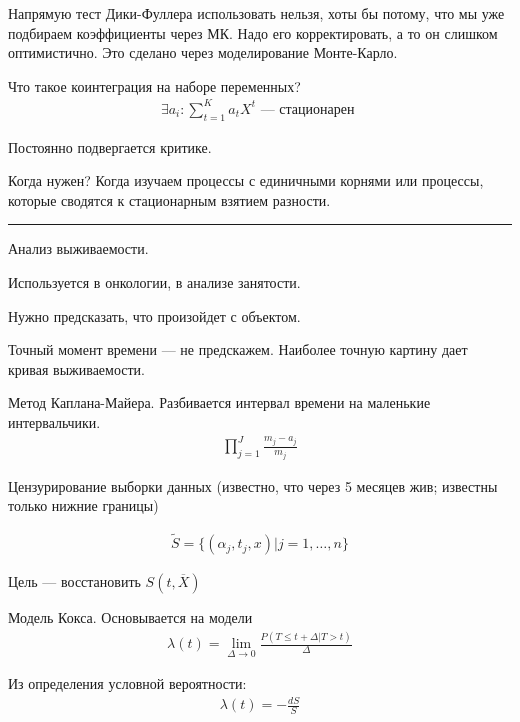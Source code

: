 \documentclass{book}
\begin{document}
Напрямую тест Дики-Фуллера использовать нельзя, хоты бы потому, что мы уже подбираем коэффициенты через МК. Надо его корректировать, а то он слишком оптимистично. Это сделано через моделирование Монте-Карло.

Что такое коинтеграция на наборе переменных?
\begin{gather*}
  \exists a_i: \sum_{t=1}^{K} {a_tX^t} \textrm{ --- стационарен }
\end{gather*}

Постоянно подвергается критике.

Когда нужен? Когда изучаем процессы с единичными корнями или процессы, которые сводятся к стационарным взятием разности.
\hrule

Анализ выживаемости.

Используется в онкологии, в анализе занятости.

Нужно предсказать, что произойдет с объектом.

Точный момент времени --- не предскажем. Наиболее точную картину дает кривая выживаемости.


Метод Каплана-Майера. Разбивается интервал времени на маленькие интервальчики.
\begin{gather*}
  \prod_{j=1}^{J} {\frac{m_j-a_j}{m_j}}
\end{gather*}

Цензурирование выборки данных (известно, что через 5 месяцев жив; известны только нижние границы)

\begin{gather*}
  \tilde{S}=\{(\alpha_j, t_j, x) | j=1,\dots,n\}
\end{gather*}

Цель --- восстановить $S(t, \overline{X})$

Модель Кокса. Основывается на модели
\begin{gather*}
  \lambda(t)=\lim_{\Delta\rightarrow 0} {\frac{P(T\leq t+\Delta|T>t)}{\Delta}}
\end{gather*}

Из определения условной вероятности:
\begin{gather*}
  \lambda(t)=-\frac{dS}{S}
\end{gather*}
\end{document}
